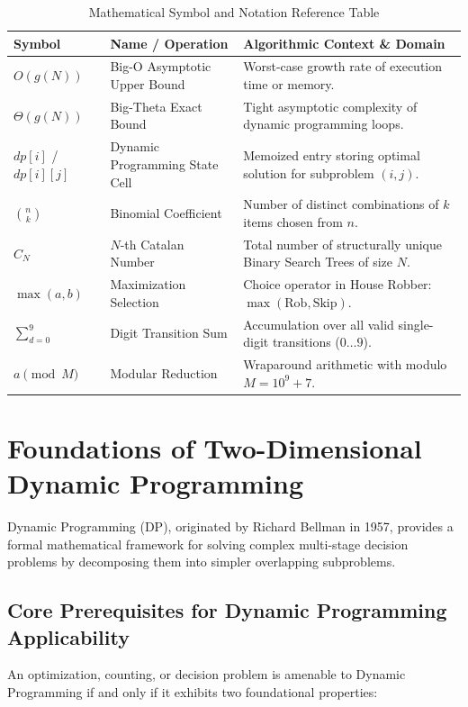 \documentclass[10pt,journal,compsoc,onecolumn]{IEEEtran}
\begin{document}
\begin{table}[htbp]
\centering
\caption{Mathematical Symbol and Notation Reference Table}
\label{tab:math-symbols}
\begin{tabular}{lll}
\toprule
\textbf{Symbol} & \textbf{Name / Operation} & \textbf{Algorithmic Context \& Domain} \\
\midrule
$O(g(N))$ & Big-O Asymptotic Upper Bound & Worst-case growth rate of execution time or memory. \\
$\Theta(g(N))$ & Big-Theta Exact Bound & Tight asymptotic complexity of dynamic programming loops. \\
$dp[i]$ / $dp[i][j]$ & Dynamic Programming State Cell & Memoized entry storing optimal solution for subproblem $(i,j)$. \\
$\binom{n}{k}$ & Binomial Coefficient & Number of distinct combinations of $k$ items chosen from $n$. \\
$C_N$ & $N$-th Catalan Number & Total number of structurally unique Binary Search Trees of size $N$. \\
$\max(a, b)$ & Maximization Selection & Choice operator in House Robber: $\max(\text{Rob}, \text{Skip})$. \\
$\sum_{d=0}^{9}$ & Digit Transition Sum & Accumulation over all valid single-digit transitions ($0 \dots 9$). \\
$a \pmod M$ & Modular Reduction & Wraparound arithmetic with modulo $M = 10^9 + 7$. \\
\bottomrule
\end{tabular}
\end{table}

\section{Foundations of Two-Dimensional Dynamic Programming}
\label{sec:dp-foundations}

Dynamic Programming (DP), originated by Richard Bellman in 1957, provides a formal mathematical framework for solving complex multi-stage decision problems by decomposing them into simpler overlapping subproblems.

\subsection{Core Prerequisites for Dynamic Programming Applicability}

An optimization, counting, or decision problem is amenable to Dynamic Programming if and only if it exhibits two foundational properties:
\end{document}
